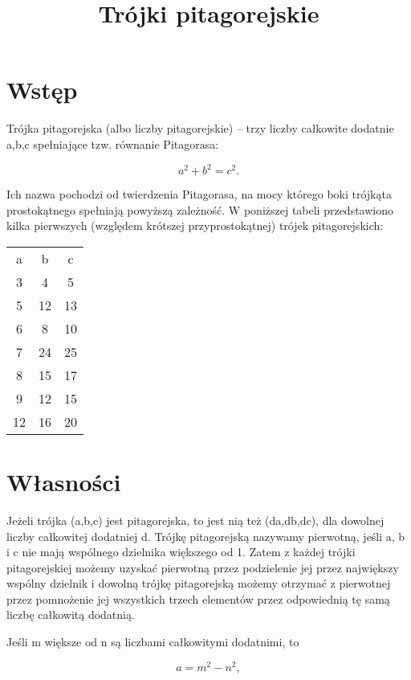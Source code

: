 \documentclass{article}
\begin{document}
\title{Trójki pitagorejskie}
\maketitle

\section*{Wstęp}
Trójka pitagorejska (albo liczby pitagorejskie) – trzy liczby całkowite dodatnie a,b,c spełniające tzw. równanie Pitagorasa: 

$$a^{2}+b^{2}=c^{2}.$$

Ich nazwa pochodzi od twierdzenia Pitagorasa, na mocy którego boki trójkąta prostokątnego spełniają powyższą zależność. W poniższej tabeli przedstawiono kilka pierwszych (względem krótszej przyprostokątnej) trójek pitagorejskich: 

\begin{center}
	
\begin{tabular}{ c c c }
	a & b & c \\
	3 & 4 & 5 \\ 
	5 & 12 & 13 \\  
	6 & 8 & 10 \\
	7 & 24 & 25 \\
	8 & 15 & 17 \\
	9 & 12 & 15 \\
	12 & 16 & 20    
\end{tabular}

\end{center}


\section*{Własności}
Jeżeli trójka (a,b,c) jest pitagorejska, to jest nią też (da,db,dc), dla dowolnej liczby całkowitej dodatniej d. Trójkę pitagorejską nazywamy pierwotną, jeśli a, b i c nie mają wspólnego dzielnika większego od 1. Zatem z każdej trójki pitagorejskiej możemy uzyskać pierwotną przez podzielenie jej przez największy wspólny dzielnik i dowolną trójkę pitagorejską możemy otrzymać z pierwotnej przez pomnożenie jej wszystkich trzech elementów przez odpowiednią tę samą liczbę całkowitą dodatnią. 

Jeśli m większe od n są liczbami całkowitymi dodatnimi, to 

\begin{equation}
	a=m^{2}-n^{2},
\end{equation}
\end{document}
